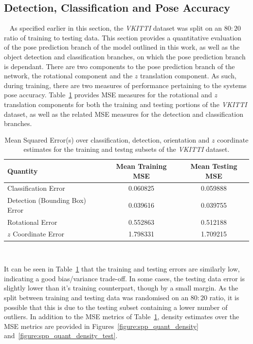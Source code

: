 \subsection{Detection, Classification and Pose Accuracy}
~\label{sec:spp_quantitative_pose_accuracy}
As specified earlier in this section, the \textit{VKITTI} dataset was split on an \( 80:20 \) ratio of training to 
testing data. This section provides a quantitative evaluation of the pose prediction branch of the model outlined 
in this work, as well as the object detection and classification branches, on which the pose prediction branch is 
dependant. There are two components to the pose prediction branch of the network, the rotational component and 
the \( z \) translation component. As such, during training, there are two measures of performance pertaining to 
the systems pose accuracy. Table~\ref{table:spp_pose_mse} provides MSE measures for the rotational and \( z \) translation 
components for both the training and testing portions of the \textit{VKITTI} dataset, as well as the related MSE measures 
for the detection and classification branches.

\begin{table}[!htbp]
  \begin{center}
    \begin{tabular}{l c c}
      Quantity & Mean Training MSE & Mean Testing MSE \\
      \midrule
      Classification Error & 0.060825 & 0.059888\\
      Detection (Bounding Box) Error & 0.039616 & 0.039755\\
      Rotational Error & 0.552863 & 0.512188\\
      \( z \) Coordinate Error & 1.798331 & 1.709215
    \end{tabular}
  \end{center}
  \caption[Detection, Classifiction and Pose Performance]{Mean Squared Error(s) over classification, detection, orientation 
  and \( z \) coordinate estimates for the training and testng subsets of the \textit{VKITTI} dataset.}
  ~\label{table:spp_pose_mse}
\end{table}

It can be seen in Table~\ref{table:spp_pose_mse} that the training and testing errors are similarly low, indicating a good 
bias/variance trade-off. In some cases, the testing data error is slightly lower than it's training counterpart, though by a 
small margin. As the split between training and testing data was randomised on an \( 80:20 \) ratio, it is possible that this 
is due to the testing subset containing a lower number of outliers. In addition to the MSE metrics of Table~\ref{table:spp_pose_mse}, 
density estimates over the MSE metrics are provided in Figures~\ref{figure:spp_quant_density} and~\ref{figure:spp_quant_density_test}.

